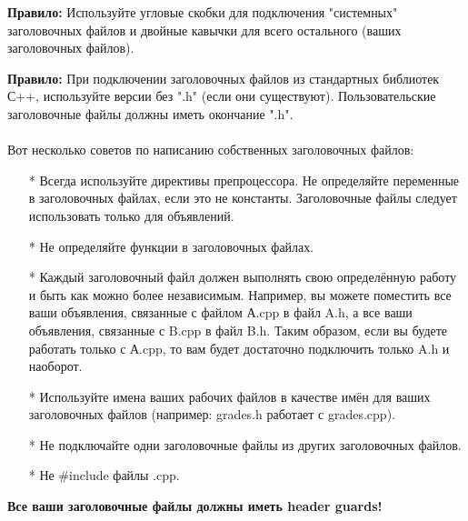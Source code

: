 \documentclass[a4paper,16pt]{report} %
\begin{document}
\begin{sloppypar}
	\textbf{Правило:} Используйте угловые скобки для подключения "системных" заголовочных файлов и двойные кавычки для всего остального (ваших заголовочных файлов).
\end{sloppypar}
\begin{sloppypar}
	\textbf{Правило:} При подключении заголовочных файлов из стандартных библиотек С++, используйте версии без ".h" (если они существуют). Пользовательские заголовочные файлы должны иметь окончание ".h".
\\ \\
Вот несколько советов по написанию собственных заголовочных файлов:
\begin{itemize}
	\item[*]Всегда используйте директивы препроцессора.
	Не определяйте переменные в заголовочных файлах, если это не константы. Заголовочные файлы следует использовать только для объявлений.
	\item[*]Не определяйте функции в заголовочных файлах.
	\item[*]Каждый заголовочный файл должен выполнять свою определённую работу и быть как можно более независимым. Например, вы можете поместить все ваши объявления, связанные с файлом А.cpp в файл A.h, а все ваши объявления, связанные с B.cpp в файл B.h. Таким образом, если вы будете работать только с А.cpp, то вам будет достаточно подключить только A.h и наоборот.
	\item[*]Используйте имена ваших рабочих файлов в качестве имён для ваших заголовочных файлов (например: grades.h работает с grades.cpp).
	\item[*]Не подключайте одни заголовочные файлы из других заголовочных файлов.
	\item[*]Не \#include  файлы .cpp.
\end{itemize}
\begin{center}
	\textbf{Все ваши заголовочные файлы должны иметь header guards!}
\end{center}
\end{sloppypar}
\end{document}

